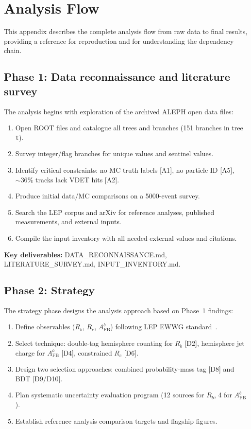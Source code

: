 \documentclass[11pt,a4paper]{article}
\begin{document}
\section{Analysis Flow}
\label{app:analysis_flow}

This appendix describes the complete analysis flow from raw data to final results,
providing a reference for reproduction and for understanding the dependency chain.

\subsection{Phase 1: Data reconnaissance and literature survey}

The analysis begins with exploration of the archived ALEPH open data files:
\begin{enumerate}
\item Open ROOT files and catalogue all trees and branches (151 branches in tree \texttt{t}).
\item Survey integer/flag branches for unique values and sentinel values.
\item Identify critical constraints: no MC truth labels [A1], no particle ID [A5],
$\sim 36\%$ tracks lack VDET hits [A2].
\item Produce initial data/MC comparisons on a 5000-event survey.
\item Search the LEP corpus and arXiv for reference analyses, published measurements,
and external inputs.
\item Compile the input inventory with all needed external values and citations.
\end{enumerate}

\textbf{Key deliverables:} DATA\_RECONNAISSANCE.md, LITERATURE\_SURVEY.md, INPUT\_INVENTORY.md.

\subsection{Phase 2: Strategy}

The strategy phase designs the analysis approach based on Phase~1 findings:
\begin{enumerate}
\item Define observables ($R_b$, $R_c$, $A_\mathrm{FB}^b$) following LEP EWWG
standard~\cite{LEP:EWWG:2005}.
\item Select technique: double-tag hemisphere counting for $R_b$ [D2], hemisphere jet
charge for $A_\mathrm{FB}^b$ [D4], constrained $R_c$ [D6].
\item Design two selection approaches: combined probability-mass tag [D8] and BDT [D9/D10].
\item Plan systematic uncertainty evaluation program (12 sources for $R_b$, 4 for $A_\mathrm{FB}^b$).
\item Establish reference analysis comparison targets and flagship figures.
\end{enumerate}
\end{document}
